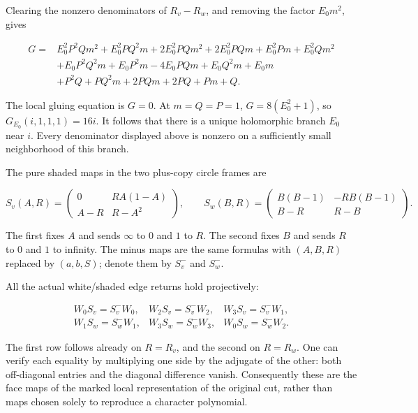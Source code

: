 Clearing the nonzero denominators of \(R_v-R_w\), and removing
the factor \(E_0m^2\), gives

\begin{equation}\label{gi:N7}
\begin{aligned}
G={}&E_0^2P^2Qm^2+E_0^2PQ^2m+2E_0^2PQm^2+2E_0^2PQm
       +E_0^2Pm+E_0^2Qm^2\\
 &+E_0P^2Q^2m+E_0P^2m-4E_0PQm+E_0Q^2m+E_0m\\
 &+P^2Q+PQ^2m+2PQm+2PQ+Pm+Q.
\end{aligned}
\end{equation}

The local gluing equation is \(G=0\). At \(m=Q=P=1\),
\(G=8(E_0^2+1)\), so \(G_{E_0}(i,1,1,1)=16i\).
It follows that there is a unique holomorphic branch \(E_0\) near
\(i\). Every denominator displayed above is nonzero on a sufficiently
small neighborhood of this branch.

The pure shaded maps in the two plus-copy circle frames are

\begin{equation}\label{gi:N8}
S_v(A,R)=
 \begin{pmatrix}0&RA(1-A)\\A-R&R-A^2\end{pmatrix},\qquad
 S_w(B,R)=
 \begin{pmatrix}B(B-1)&-RB(B-1)\\B-R&R-B\end{pmatrix}.
\end{equation}

The first fixes \(A\) and sends \(\infty\) to \(0\) and \(1\)
to \(R\). The second fixes \(B\) and sends \(R\) to \(0\)
and \(1\) to infinity. The minus maps are the same formulas with
\((A,B,R)\) replaced by \((a,b,S)\); denote them by
\(S_v^-\) and \(S_w^-\).

All the actual white/shaded edge returns hold projectively:

\begin{equation}\label{gi:N9}
\begin{array}{lll}
 W_0S_v=S_v^-W_0,&W_2S_v=S_v^-W_2,&W_3S_v=S_v^-W_1,\\
 W_1S_w=S_w^-W_1,&W_3S_w=S_w^-W_3,&W_0S_w=S_w^-W_2.
\end{array}
\end{equation}

The first row follows already on \(R=R_v\), and the second on
\(R=R_w\). One can verify each equality by multiplying one side
by the adjugate of the other: both off-diagonal entries and the
diagonal difference vanish. Consequently these are the face maps
of the marked local representation of the original cut, rather than
maps chosen solely to reproduce a character polynomial.

